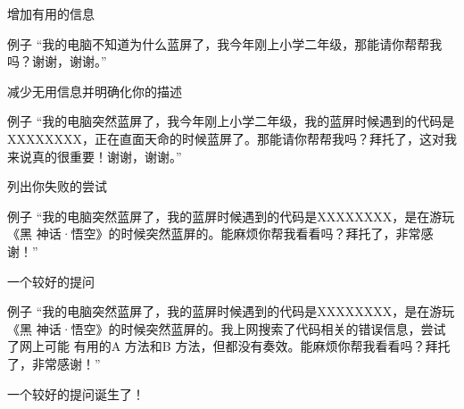 \documentclass{beamer}
\begin{document}
\begin{frame}{增加有用的信息}
    \begin{exampleblock}{例子}
        “我的电脑不知道为什么蓝屏了，我今年刚上小学二年级，那能请你帮帮我吗？谢谢，谢谢。”
    \end{exampleblock}

\end{frame}

\begin{frame}{减少无用信息并明确化你的描述}
    \begin{exampleblock}{例子}
        “我的电脑突然蓝屏了，我今年刚上小学二年级，我的蓝屏时候遇到的代码是 XXXXXXXX，正在直面天命的时候蓝屏了。那能请你帮帮我吗？拜托了，这对我来说真的很重要！谢谢，谢谢。”
    \end{exampleblock}

\end{frame}

\begin{frame}{列出你失败的尝试}
    \begin{exampleblock}{例子}
        “我的电脑突然蓝屏了，我的蓝屏时候遇到的代码是XXXXXXXX，是在游玩《黑
        神话·悟空》的时候突然蓝屏的。能麻烦你帮我看看吗？拜托了，非常感谢！”
    \end{exampleblock}

\end{frame}

\begin{frame}{一个较好的提问}
    \begin{exampleblock}{例子}
        “我的电脑突然蓝屏了，我的蓝屏时候遇到的代码是XXXXXXXX，是在游玩《黑
神话·悟空》的时候突然蓝屏的。我上网搜索了代码相关的错误信息，尝试了网上可能
有用的A 方法和B 方法，但都没有奏效。能麻烦你帮我看看吗？拜托了，非常感谢！”
    \end{exampleblock}

    一个较好的提问诞生了！
\end{frame}
\end{document}
